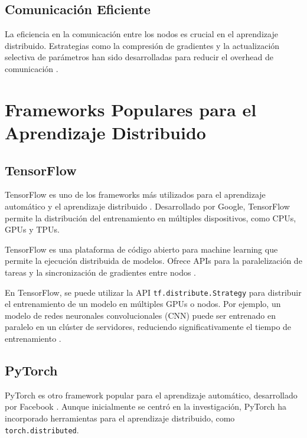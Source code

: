 \subsection{Comunicación Eficiente}
La eficiencia en la comunicación entre los nodos es crucial en el aprendizaje distribuido. Estrategias como la compresión de gradientes y la actualización selectiva de parámetros han sido desarrolladas para reducir el overhead de comunicación \cite{lin2017deep}.
\section{Frameworks Populares para el Aprendizaje Distribuido}
\label{chap:4}
\subsection{TensorFlow}
TensorFlow es uno de los frameworks más utilizados para el aprendizaje automático y el aprendizaje distribuido \cite{abadi2016tensorflow}. Desarrollado por Google, TensorFlow permite la distribución del entrenamiento en múltiples dispositivos, como CPUs, GPUs y TPUs.

\begin{definition}[TensorFlow]
	TensorFlow es una plataforma de código abierto para machine learning que permite la ejecución distribuida de modelos. Ofrece APIs para la paralelización de tareas y la sincronización de gradientes entre nodos \cite{tensorflow_api}.
\end{definition}

\begin{example}
	En TensorFlow, se puede utilizar la API \texttt{tf.distribute.Strategy} para distribuir el entrenamiento de un modelo en múltiples GPUs o nodos. Por ejemplo, un modelo de redes neuronales convolucionales (CNN) puede ser entrenado en paralelo en un clúster de servidores, reduciendo significativamente el tiempo de entrenamiento \cite{tensorflow_example}.
\end{example}

\subsection{PyTorch}
PyTorch es otro framework popular para el aprendizaje automático, desarrollado por Facebook \cite{paszke2019pytorch}. Aunque inicialmente se centró en la investigación, PyTorch ha incorporado herramientas para el aprendizaje distribuido, como \texttt{torch.distributed}.

